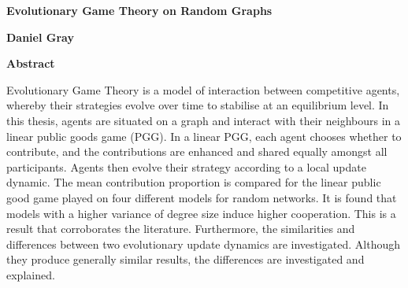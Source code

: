 \thispagestyle{plain}
\begin{center}
    \Large
    \textbf{Evolutionary Game Theory on Random Graphs}
    
    \vspace{0.4cm}
    \large
    
    
    \vspace{0.4cm}
    \textbf{Daniel Gray}
    
    \vspace{0.9cm}
    \textbf{Abstract}
\end{center}
Evolutionary Game Theory is a model of interaction between competitive agents, whereby their strategies evolve over time to stabilise at an equilibrium level. In this thesis, agents are situated on a graph and interact with their neighbours in a linear public goods game (PGG). In a linear PGG,  each agent  chooses whether to contribute, and the contributions are enhanced and shared equally amongst all participants. Agents then evolve their strategy according to a local update dynamic. The mean contribution proportion is compared for the linear public good game played on four different models for random networks. It is found that models with a higher variance of degree size induce higher cooperation. This is a result that corroborates the literature. Furthermore, the similarities and differences between two evolutionary update dynamics are investigated. Although they produce generally similar results, the differences are investigated and explained. 